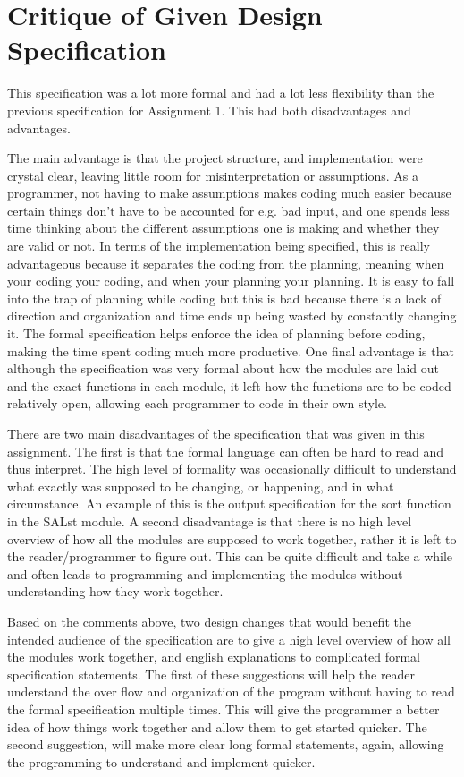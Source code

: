\documentclass[12pt]{article}
\begin{document}
\section{Critique of Given Design Specification}

This specification was a lot more formal and had a lot less flexibility than
the previous specification for Assignment 1. This had both disadvantages and
advantages. 

The main advantage is that the project structure, and implementation were
crystal clear, leaving little room for misinterpretation or assumptions.
As a programmer, not having to make assumptions makes coding much easier 
because certain things don't have to be accounted for e.g. bad input, and
one spends less time thinking about the different assumptions one is 
making and whether they are valid or not. In terms of the implementation
being specified, this is really advantageous because it separates the coding
from the planning, meaning when your coding your coding, and when your
planning your planning. It is easy to fall into the trap of planning while
coding but this is bad because there is a lack of direction and organization
and time ends up being wasted by constantly changing it. The formal
specification helps enforce the idea of planning before coding, making the
time spent coding much more productive. One final advantage is that although
the specification was very formal about how the modules are laid out and the
exact functions in each module, it left how the functions are to be coded
relatively open, allowing each programmer to code in their own style.

There are two main disadvantages of the specification that was given in this
assignment. The first is that the formal language can often be hard to read
and thus interpret. The high level of formality was occasionally difficult
to understand what exactly was supposed to be changing, or happening, and in
what circumstance. An example of this is the output specification for the
sort function in the SALst module. A second disadvantage is that there is no
high level overview of how all the modules are supposed to work together,
rather it is left to the reader/programmer to figure out. This can be
quite difficult and take a while and often leads to programming and implementing
the modules without understanding how they work together.

Based on the comments above, two design changes that would benefit the
intended audience of the specification are to give a high level overview
of how all the modules work together, and english explanations to complicated
formal specification statements. The first of these suggestions will help
the reader understand the over flow and organization of the program without
having to read the formal specification multiple times. This will give the
programmer a better idea of how things work together and allow them to get
started quicker. The second suggestion, will make more clear long formal
statements, again, allowing the programming to understand and implement
quicker.
\end{document}
